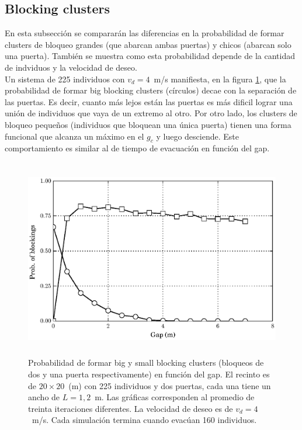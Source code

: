 \subsection{Blocking clusters}

En esta subsección se compararán las diferencias en la probabilidad de formar clusters de bloqueo grandes (que abarcan ambas puertas) y chicos (abarcan solo una puerta). También se muestra como esta probabilidad depende de la cantidad de indviduos y la velocidad de deseo.\\
Un sistema de 225 individuos con $v_d=4$~m/s manifiesta, en la figura \ref{proba_vsgap_v4_big_small}, que la probabilidad de formar big blocking clusters (círculos) decae con la separación de las puertas. Es decir, cuanto más lejos están las puertas es más dificil lograr una unión de individuos que vaya de un extremo al otro.
Por otro lado, los clusters de bloqueo pequeños (individuos que bloquean una única puerta) tienen una forma funcional que alcanza un máximo en el $g_c$ y luego desciende. Este comportamiento es similar al de tiempo de evacuación en función del gap.


\begin{figure}[H]
    \centering
    \includegraphics[height=8.7cm]{figuras/proba_vsgap_v4_big_small.eps}
    \caption[width=5cm]{Probabilidad de formar big y small blocking clusters (bloqueos de dos y una puerta respectivamente) en función del gap. El recinto es de $20\times 20$~(m) con 225 individuos y dos puertas, cada una tiene un ancho de $L=1,2$~m. Las gráficas corresponden al promedio de treinta iteraciones diferentes. La velocidad de deseo es de $v_d=4$~m/s. Cada simulación termina cuando evacúan 160 individuos.}
    \label{proba_vsgap_v4_big_small}
\end{figure}

